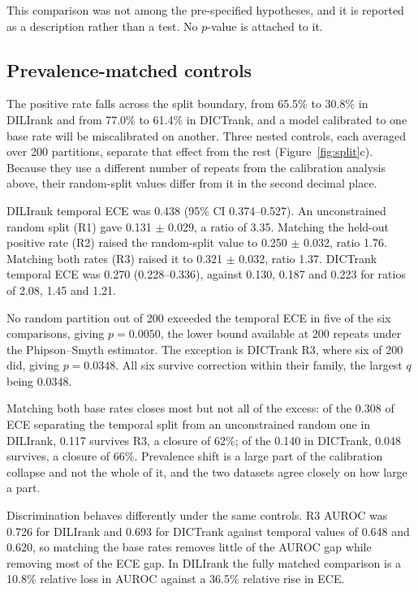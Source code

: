 This comparison was not among the pre-specified hypotheses, and it is reported as
a description rather than a test. No $p$-value is attached to it.

\subsection{Prevalence-matched controls}

The positive rate falls across the split boundary, from 65.5\% to 30.8\% in
DILIrank and from 77.0\% to 61.4\% in DICTrank, and a model calibrated to one base
rate will be miscalibrated on another. Three nested controls, each averaged over
200 partitions, separate that effect from the rest (Figure~\ref{fig:split}c).
Because they use a different number of repeats from the calibration analysis
above, their random-split values differ from it in the second decimal place.

DILIrank temporal ECE was 0.438 (95\% CI 0.374--0.527). An unconstrained random
split (R1) gave 0.131 $\pm$ 0.029, a ratio of 3.35. Matching the held-out positive
rate (R2) raised the random-split value to 0.250 $\pm$ 0.032, ratio 1.76. Matching
both rates (R3) raised it to 0.321 $\pm$ 0.032, ratio 1.37. DICTrank temporal ECE
was 0.270 (0.228--0.336), against 0.130, 0.187 and 0.223 for ratios of 2.08, 1.45
and 1.21.

No random partition out of 200 exceeded the temporal ECE in five of the six
comparisons, giving $p = 0.0050$, the lower bound available at 200 repeats under
the Phipson--Smyth estimator. The exception is DICTrank R3, where six of 200 did,
giving $p = 0.0348$. All six survive correction within their family, the largest
$q$ being 0.0348.

Matching both base rates closes most but not all of the excess: of the 0.308 of
ECE separating the temporal split from an unconstrained random one in DILIrank,
0.117 survives R3, a closure of 62\%; of the 0.140 in DICTrank, 0.048 survives, a
closure of 66\%. Prevalence shift is a large part of the calibration collapse and
not the whole of it, and the two datasets agree closely on how large a part.

Discrimination behaves differently under the same controls. R3 AUROC was 0.726 for
DILIrank and 0.693 for DICTrank against temporal values of 0.648 and 0.620, so
matching the base rates removes little of the AUROC gap while removing most of the
ECE gap. In DILIrank the fully matched comparison is a 10.8\% relative loss in
AUROC against a 36.5\% relative rise in ECE.

